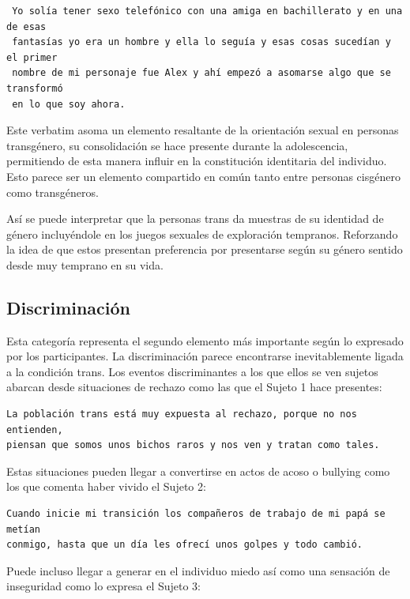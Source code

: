 \begin{verbatim}
 Yo solía tener sexo telefónico con una amiga en bachillerato y en una de esas
 fantasías yo era un hombre y ella lo seguía y esas cosas sucedían y el primer
 nombre de mi personaje fue Alex y ahí empezó a asomarse algo que se transformó
 en lo que soy ahora.
\end{verbatim}

Este verbatim asoma un elemento resaltante de la orientación sexual en personas
transgénero, su consolidación se hace presente durante la adolescencia,
permitiendo de esta manera influir en la constitución identitaria del individuo.
Esto parece ser un elemento compartido en común tanto entre personas cisgénero
como transgéneros.

Así se puede interpretar que la personas trans da muestras de su identidad de
género incluyéndole en los juegos sexuales de exploración tempranos. Reforzando
la idea de que estos presentan preferencia por presentarse según su género
sentido desde muy temprano en su vida.

\subsection{Discriminación}

Esta categoría representa el segundo elemento más importante según lo expresado
por los participantes. La discriminación parece encontrarse inevitablemente
ligada a la condición trans. Los eventos discriminantes a los que ellos se ven
sujetos abarcan desde situaciones de rechazo como las que el Sujeto 1 hace
presentes:

\begin{verbatim}
La población trans está muy expuesta al rechazo, porque no nos entienden,
piensan que somos unos bichos raros y nos ven y tratan como tales.
\end{verbatim}

Estas situaciones pueden llegar a convertirse en actos de acoso o bullying como
los que comenta haber vivido el Sujeto 2:

\begin{verbatim}
Cuando inicie mi transición los compañeros de trabajo de mi papá se metían
conmigo, hasta que un día les ofrecí unos golpes y todo cambió.
\end{verbatim}

 Puede incluso llegar a generar en el individuo miedo así como una sensación de
 inseguridad como lo expresa el Sujeto 3:

